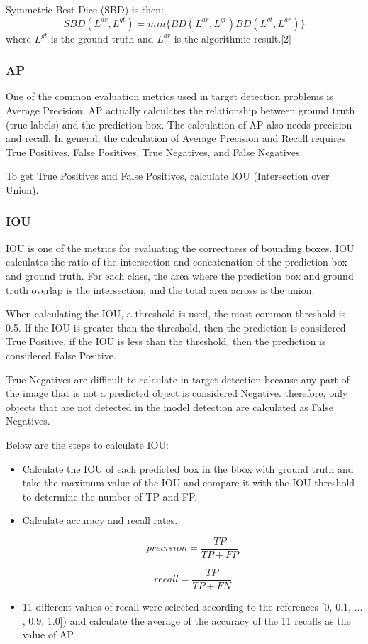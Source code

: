 \documentclass[conference]{IEEEtran}
\begin{document}
Symmetric Best Dice (SBD) is then:
\begin{equation}
SBD(L^{ar},L^{gt}) = min \{ BD(L^{ar}, L^{gt}) BD(L^{gt}, L^{ar}) \}
\end{equation}
where $L^{gt}$ is the ground truth and  $L^{ar}$ is the algorithmic result.[2]\\

\subsubsection{AP}
One of the common evaluation metrics used in target detection problems is Average Precision. AP actually calculates the relationship between ground truth (true labels) and the prediction box. The calculation of AP also needs precision and recall.
In general, the calculation of Average Precision and Recall requires True Positives, False Positives, True Negatives, and False Negatives.

To get True Positives and False Positives, calculate IOU (Intersection over Union).
\subsubsection{IOU}
IOU is one of the metrics for evaluating the correctness of bounding boxes. IOU calculates the ratio of the intersection and concatenation of the prediction box and ground truth. For each class, the area where the prediction box and ground truth overlap is the intersection, and the total area across is the union.

When calculating the IOU, a threshold is used, the most common threshold is 0.5. If the IOU is greater than the threshold, then the prediction is considered True Positive. if the IOU is less than the threshold, then the prediction is considered False Positive.

True Negatives are difficult to calculate in target detection because any part of the image that is not a predicted object is considered Negative. therefore, only objects that are not detected in the model detection are calculated as False Negatives.

Below are the steps to calculate IOU:
\begin{itemize}
\item Calculate the IOU of each predicted box in the bbox with ground truth and take the maximum value of the IOU and compare it with the IOU threshold to determine the number of TP and FP.
\item Calculate accuracy and recall rates.

\begin{equation}
precision = \frac{TP}{TP+FP}
\end{equation}

\begin{equation}
recall = \frac{TP}{TP+FN}
\end{equation}

\item 11 different values of recall were selected according to the references [0, 0.1, ... , 0.9, 1.0]) and calculate the average of the accuracy of the 11 recalls as the value of AP.
\end{itemize}
\end{document}
